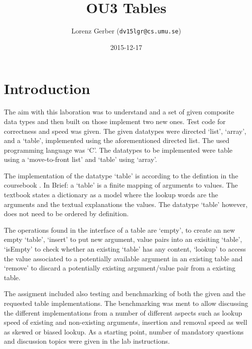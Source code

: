 \documentclass[a4paper,11pt,twoside]{article}
\title{OU3 Tables}
\author{Lorenz Gerber  ({\tt{dv15lgr@cs.umu.se}})}
\date{2015-12-17}
\begin{document}
\maketitle

\tableofcontents
\newpage

\section{Introduction} 
The aim with this laboration was to understand and a set of given 
composite data types and then built on those implement two new ones.
Test code for correctness and speed was given. The given datatypes
were directed `list', `array', and a `table', implemented using the 
aforementioned directed list. The used programming language was `C'. 
The datatypes to be implemented were table using a `move-to-front 
list' and `table' using `array'.

The implementation of the datatype `table' is according to the 
defintion in the coursebook \cite[pp. 117 -- 132]{janlert2000}. In Brief:
a `table' is a finite mapping of arguments to values. The textbook states 
a dictionary as a model where the lookup words are the arguments and the
textual explanations the values. The datatype `table' however, does not 
need to be ordered by definition.

The operations found in the interface of a table are `empty', to create
an new empty `table', `insert' to put new argument, value pairs into an 
exisiting `table', `isEmpty' to check whether an existing `table' has any
content, `lookup' to access the value associated to a potentially available
argument in an existing table and `remove' to discard a potentially
existing argument/value pair from a existing table.  

The assigment included also testing and benchmarking of both the given and
the requested table implementations. The benchmarking was ment to
allow discussing the different implementations from a number of different
aspects such as lookup speed of existing and non-existing arguments, insertion
and removal speed as well as skewed or biased lookup. As a starting point,
number of mandatory questions and discussion topics were given in the
lab instructions.  
\end{document}
